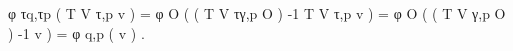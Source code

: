 φ τq,τp ( T V τ,p v ) = φ O ( ( T V τγ,p O ) -1 T V τ,p v ) = φ O ( ( T V γ,p O ) -1 v ) = φ q,p ( v ) .
